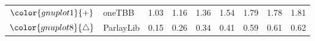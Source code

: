 \begin{tabular}{clrrrrrrr}
\rowcolor{gnuplot1!10}$\color{gnuplot1}{+}$ & oneTBB & \cellcolor{gnuplot1!10} 1.03 & \cellcolor{gnuplot1!10} 1.16 & \cellcolor{gnuplot1!10} 1.36 & \cellcolor{gnuplot1!10} 1.54 & \cellcolor{gnuplot1!10} 1.79 & \cellcolor{gnuplot1!10} 1.78 & \cellcolor{gnuplot1!10} 1.81 \\
\rowcolor{gnuplot8!10}$\color{gnuplot8}{\triangle}$ & ParlayLib & \cellcolor{gnuplot8!10} 0.15 & \cellcolor{gnuplot8!10} 0.26 & \cellcolor{gnuplot8!10} 0.34 & \cellcolor{gnuplot8!10} 0.41 & \cellcolor{gnuplot8!10} 0.59 & \cellcolor{gnuplot8!10} 0.61 & \cellcolor{gnuplot8!10} 0.62 \\
\bottomrule
\end{tabular}
